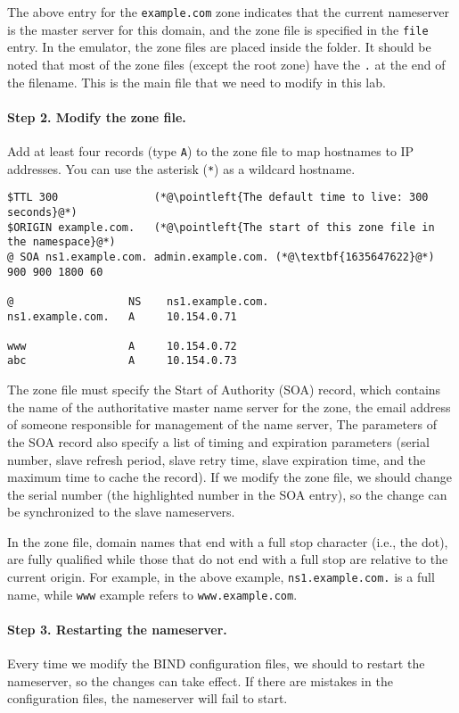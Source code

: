 The above entry for the \texttt{example.com} zone 
indicates that the current nameserver
is the master server for this domain, and the zone file is
specified in the \texttt{file} entry.
In the emulator, the zone files are placed inside the 
 folder. It should be noted that 
most of the zone files (except the root zone) have the \texttt{.} 
at the end of the filename. 
This is the main file that we need to modify in this lab. 

\paragraph{Step 2. Modify the zone file.}
Add at least four records (type \texttt{A}) to the zone file
to map hostnames to IP addresses. You can use the 
asterisk (\texttt{*}) as a wildcard hostname. 


\begin{lstlisting}
$TTL 300               (*@\pointleft{The default time to live: 300 seconds}@*) 
$ORIGIN example.com.   (*@\pointleft{The start of this zone file in the namespace}@*) 
@ SOA ns1.example.com. admin.example.com. (*@\textbf{1635647622}@*) 900 900 1800 60

@                  NS    ns1.example.com.
ns1.example.com.   A     10.154.0.71

www                A     10.154.0.72
abc                A     10.154.0.73 
\end{lstlisting}

The zone file must specify the Start of Authority (SOA) record, which
contains the name of the authoritative master name server for the zone, 
the email address of someone responsible for management of the name server,
The parameters of the SOA record also specify a list of timing
and expiration parameters (serial number, slave refresh period, slave retry time, slave
expiration time, and the maximum time to cache the record). 
If we modify the zone file, we should change the serial number (the highlighted 
number in the SOA entry), so the change can be synchronized to the 
slave nameservers. 

In the zone file, domain names that end with a full stop character (i.e., the dot),
are fully qualified while those that do not end with a full stop are
relative to the current origin. 
For example, in the above example, \texttt{ns1.example.com.} is a full name,
while \texttt{www} example refers to \texttt{www.example.com}.


\paragraph{Step 3. Restarting the nameserver.}
Every time we modify the BIND configuration files,
we should to restart the nameserver, so the changes 
can take effect. If there are mistakes in the configuration files,
the nameserver will fail to start.


